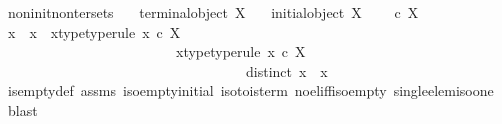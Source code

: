 \begin{isabellebody}
%
\isadelimproof
\isanewline
%
\endisadelimproof
\isanewline
{}\isamarkupfalse%
\ non{\isacharunderscore}{\kern0pt}init{\isacharunderscore}{\kern0pt}non{\isacharunderscore}{\kern0pt}ter{\isacharunderscore}{\kern0pt}sets{\isacharcolon}{\kern0pt}\isanewline
\ \ \ {\isachardoublequoteopen}{\isasymnot}{\isacharparenleft}{\kern0pt}terminal{\isacharunderscore}{\kern0pt}object\ X{\isacharparenright}{\kern0pt}{\isachardoublequoteclose}\isanewline
\ \ \ {\isachardoublequoteopen}{\isasymnot}{\isacharparenleft}{\kern0pt}initial{\isacharunderscore}{\kern0pt}object\ X{\isacharparenright}{\kern0pt}{\isachardoublequoteclose}\isanewline
\ \ \ {\isachardoublequoteopen}{\isasymOmega}\ {\isasymle}\isactrlsub c\ X{\isachardoublequoteclose}\ \isanewline
%
\isadelimproof
%
\endisadelimproof
%
\isatagproof
{}\isamarkupfalse%
\ {\isacharminus}{\kern0pt}\ \isanewline
\ \ \isamarkupfalse%
\ x{}\ \ x{}\ \ x{}{\isacharunderscore}{\kern0pt}type{\isacharbrackleft}{\kern0pt}type{\isacharunderscore}{\kern0pt}rule{\isacharbrackright}{\kern0pt}{\isacharcolon}{\kern0pt}\ {\isachardoublequoteopen}x{}\ {\isasymin}\isactrlsub c\ X{\isachardoublequoteclose}\ \ \isanewline
\ \ \ \ \ \ \ \ \ \ \ \ \ \ \ \ \ \ \ \ \ \ \ \ \ x{}{\isacharunderscore}{\kern0pt}type{\isacharbrackleft}{\kern0pt}type{\isacharunderscore}{\kern0pt}rule{\isacharbrackright}{\kern0pt}{\isacharcolon}{\kern0pt}\ {\isachardoublequoteopen}x{}\ {\isasymin}\isactrlsub c\ X{\isachardoublequoteclose}\ \isanewline
\ \ \ \ \ \ \ \ \ \ \ \ \ \ \ \ \ \ \ \ \ \ \ \ \ \ \ \ \ \ \ \ \ \ \ distinct{\isacharcolon}{\kern0pt}\ {\isachardoublequoteopen}x{}\ {\isasymnoteq}\ x{}{\isachardoublequoteclose}\isanewline
\ \ \ \ \isamarkupfalse%
\ is{\isacharunderscore}{\kern0pt}empty{\isacharunderscore}{\kern0pt}def\ assms\ iso{\isacharunderscore}{\kern0pt}empty{\isacharunderscore}{\kern0pt}initial\ iso{\isacharunderscore}{\kern0pt}to{}{\isacharunderscore}{\kern0pt}is{\isacharunderscore}{\kern0pt}term\ no{\isacharunderscore}{\kern0pt}el{\isacharunderscore}{\kern0pt}iff{\isacharunderscore}{\kern0pt}iso{\isacharunderscore}{\kern0pt}empty\ single{\isacharunderscore}{\kern0pt}elem{\isacharunderscore}{\kern0pt}iso{\isacharunderscore}{\kern0pt}one\ \isamarkupfalse%
\ blast\isanewline
\ \ \isamarkupfalse%
\ \isamarkupfalse%

\end{isabellebody}
